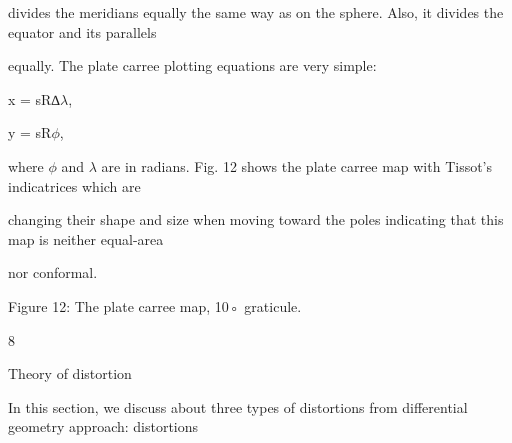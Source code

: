 \documentclass[a4paper,portrait,12pt]{article}
\begin{document}
\begin{flushleft}
divides the meridians equally the same way as on the sphere. Also, it divides the equator and its parallels
\end{flushleft}


\begin{flushleft}
equally. The plate carree plotting equations are very simple:
\end{flushleft}


\begin{flushleft}
x = sR∆$\lambda$,
\end{flushleft}





\begin{flushleft}
y = sR$\phi$,
\end{flushleft}





\begin{flushleft}
where $\phi$ and $\lambda$ are in radians. Fig. 12 shows the plate carree map with Tissot's indicatrices which are
\end{flushleft}


\begin{flushleft}
changing their shape and size when moving toward the poles indicating that this map is neither equal-area
\end{flushleft}


\begin{flushleft}
nor conformal.
\end{flushleft}





\begin{flushleft}
Figure 12: The plate carree map, 10◦ graticule.
\end{flushleft}





8





\begin{flushleft}
Theory of distortion
\end{flushleft}





\begin{flushleft}
In this section, we discuss about three types of distortions from differential geometry approach: distortions
\end{flushleft}
\end{document}
